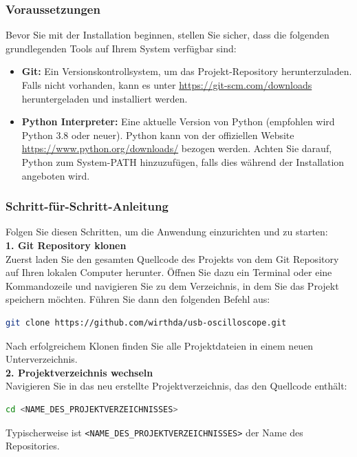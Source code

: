 \documentclass[a4paper, portrait, 12pt]{scrartcl} %
\begin{document}
\subsubsection{Voraussetzungen}

Bevor Sie mit der Installation beginnen, stellen Sie sicher, dass die folgenden grundlegenden Tools auf Ihrem System verfügbar sind:
\begin{itemize}
    \item \textbf{Git:} Ein Versionskontrollsystem, um das Projekt-Repository herunterzuladen. Falls nicht vorhanden, kann es unter \url{https://git-scm.com/downloads} heruntergeladen und installiert werden.
    \item \textbf{Python Interpreter:} Eine aktuelle Version von Python (empfohlen wird Python 3.8 oder neuer). Python kann von der offiziellen Website \url{https://www.python.org/downloads/} bezogen werden. Achten Sie darauf, Python zum System-PATH hinzuzufügen, falls dies während der Installation angeboten wird.
\end{itemize}

\subsubsection{Schritt-für-Schritt-Anleitung}

Folgen Sie diesen Schritten, um die Anwendung einzurichten und zu starten:\\

\textbf{1. Git Repository klonen}\\
Zuerst laden Sie den gesamten Quellcode des Projekts von dem Git Repository auf Ihren lokalen Computer herunter. Öffnen Sie dazu ein Terminal oder eine Kommandozeile und navigieren Sie zu dem Verzeichnis, in dem Sie das Projekt speichern möchten. Führen Sie dann den folgenden Befehl aus:

\begin{lstlisting}[language=bash, caption={Klonen des Git Repositories}]
git clone https://github.com/wirthda/usb-oscilloscope.git
\end{lstlisting}
Nach erfolgreichem Klonen finden Sie alle Projektdateien in einem neuen Unterverzeichnis.\\

\textbf{2. Projektverzeichnis wechseln}\\
Navigieren Sie in das neu erstellte Projektverzeichnis, das den Quellcode enthält:

\begin{lstlisting}[language=bash, caption={Wechseln ins Projektverzeichnis}]
cd <NAME_DES_PROJEKTVERZEICHNISSES>
\end{lstlisting}
Typischerweise ist \texttt{<NAME\_DES\_PROJEKTVERZEICHNISSES>} der Name des Repositories.\\
\end{document}
